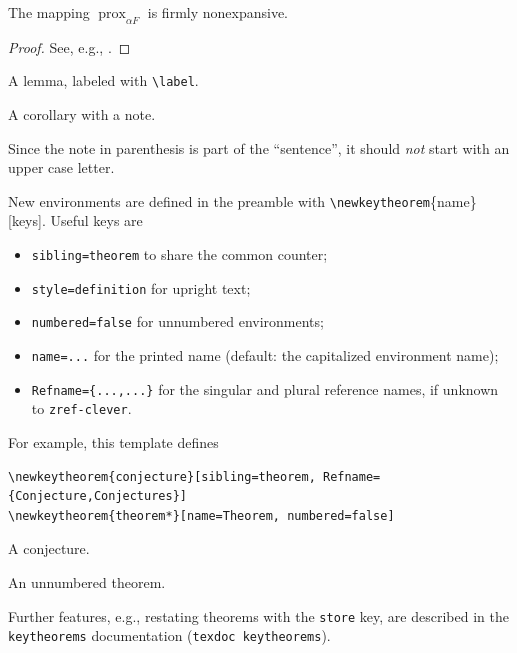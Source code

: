 \documentclass[english,review]{jnsao}
\newcommand{\cs}[1]{\texttt{\textbackslash#1}}
\newcommand{\pkg}[1]{\texttt{#1}}
\DeclareMathOperator{\prox}{prox}
\begin{document}
\begin{theorem}\label{thm:main}
    The mapping $\prox_{\alpha F}$ is firmly nonexpansive.
\end{theorem}
\begin{proof}
    See, e.g., \cite{Rockafellar:1976}.
\end{proof}

\begin{lemma}\label{lem:aux}
    A lemma, labeled with \cs{label}.
\end{lemma}

\begin{corollary}[shrinkage]\label{cor:shrink}
    A corollary with a note.
\end{corollary}
\begin{remark}
    Since the note in parenthesis is part of the ``sentence'', it should \emph{not} start with an upper case letter.
\end{remark}

New environments are defined in the preamble with \cs{newkeytheorem}\{name\}[keys]. Useful keys are
\begin{itemize}
    \item \texttt{sibling=theorem} to share the common counter;
    \item \texttt{style=definition} for upright text;
    \item \texttt{numbered=false} for unnumbered environments;
    \item \texttt{name=...} for the printed name (default: the capitalized environment name);
    \item \texttt{Refname=\{...,...\}} for the singular and plural reference names, if unknown to \pkg{zref-clever}.
\end{itemize}
For example, this template defines
\begin{verbatim}
\newkeytheorem{conjecture}[sibling=theorem, Refname={Conjecture,Conjectures}]
\newkeytheorem{theorem*}[name=Theorem, numbered=false]
\end{verbatim}

\begin{conjecture}\label{conj}
    A conjecture.
\end{conjecture}

\begin{theorem*}
    An unnumbered theorem.
\end{theorem*}

Further features, e.g., restating theorems with the \texttt{store} key, are described in the \pkg{keytheorems} documentation (\texttt{texdoc keytheorems}).
\end{document}
